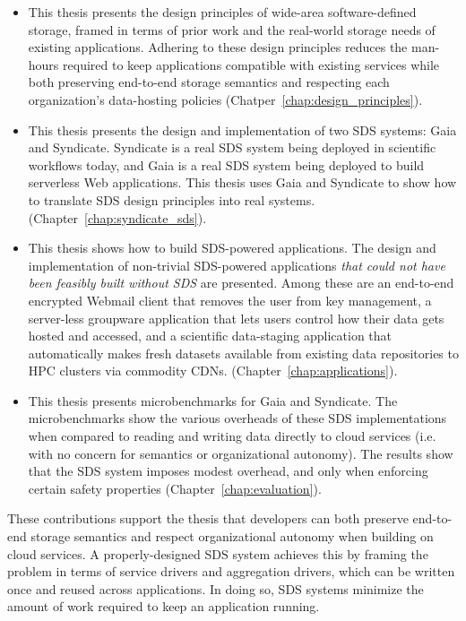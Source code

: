 \begin{itemize}

\item This thesis presents the design principles of wide-area software-defined storage, framed in
terms of prior work and the real-world storage needs of existing applications.
Adhering to these design principles reduces the man-hours required to keep applications compatible
with existing services while both preserving end-to-end storage semantics and
respecting each organization's data-hosting policies (Chatper~\ref{chap:design_principles}).

\item This thesis presents the design and implementation of two SDS systems: Gaia and
Syndicate.  Syndicate is a real SDS system being deployed in scientific
workflows today, and Gaia is a real SDS system being deployed to build
serverless Web applications.
This thesis uses Gaia and Syndicate to show how to translate SDS design
principles into real systems.
(Chapter~\ref{chap:syndicate_sds}).

\item This thesis shows how to build SDS-powered applications.  The design and
implementation of non-trivial SDS-powered applications \emph{that could not
have been feasibly built without SDS} are presented.  Among these are an end-to-end encrypted
Webmail client that removes the user from key management, a server-less
groupware application that lets users control how their data gets hosted and
accessed, and a scientific data-staging application that
automatically makes fresh datasets available from existing data repositories to
HPC clusters via commodity CDNs.
(Chapter~\ref{chap:applications}).

\item This thesis presents microbenchmarks for Gaia and Syndicate.  The
microbenchmarks show the various overheads of these SDS implementations when
compared to reading and writing data directly to cloud services (i.e. with no
concern for semantics or organizational autonomy).  The results show that the SDS
system imposes modest overhead, and only when enforcing certain safety
properties (Chapter~\ref{chap:evaluation}).

\end{itemize}

These contributions support the thesis that developers can both preserve
end-to-end storage semantics and respect organizational autonomy when building
on cloud services.  A properly-designed SDS system achieves this by framing the
problem in terms of service drivers and aggregation drivers, which can be
written once and reused across applications.  In doing so, SDS systems minimize the amount of
work required to keep an application running.



